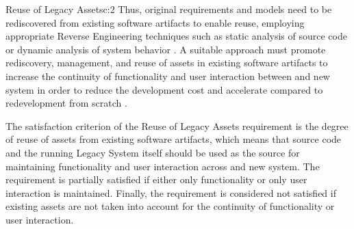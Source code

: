 \begin{thesisstakeholderrequirement}{Reuse of Legacy Assets}{c:2}
Thus, original requirements and models need to be rediscovered from existing software \glspl{artifact} to enable reuse, employing appropriate \gls{Reverse Engineering} techniques such as static analysis of  source code or dynamic analysis of system behavior \autocite{Lucia2008}.
A suitable approach must promote rediscovery, management, and reuse of assets in existing software \glspl{artifact} to increase the continuity of functionality \autocite{Almonaies2010SOAStrategies} and user interaction between  and new system in order to reduce the development cost \autocite{Khadka2016PHD} and accelerate  compared to redevelopment from scratch \autocite{Sneed2010SoftwareMigration}.

The satisfaction criterion of the Reuse of Legacy Assets requirement is the degree of reuse of assets from existing software \glspl{artifact}, which means that  source code and the running \gls{Legacy System} itself should be used as the source for maintaining functionality and user interaction across  and new system.
The requirement is partially satisfied if either only functionality or only user interaction is maintained.
Finally, the requirement is considered not satisfied if existing assets are not taken into account for the continuity of functionality or user interaction.
\end{thesisstakeholderrequirement}

